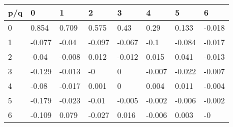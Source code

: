 \begin{tabular}{llllllll}
\toprule
p/q &      0 &      1 &      2 &      3 &      4 &      5 &      6 \\
\midrule
  0 &  0.854 &  0.709 &  0.575 &   0.43 &   0.29 &  0.133 & -0.018 \\
  1 & -0.077 &  -0.04 & -0.097 & -0.067 &   -0.1 & -0.084 & -0.017 \\
  2 &  -0.04 & -0.008 &  0.012 & -0.012 &  0.015 &  0.041 & -0.013 \\
  3 & -0.129 & -0.013 &     -0 &      0 & -0.007 & -0.022 & -0.007 \\
  4 &  -0.08 & -0.017 &  0.001 &      0 &  0.004 &  0.011 & -0.004 \\
  5 & -0.179 & -0.023 &  -0.01 & -0.005 & -0.002 & -0.006 & -0.002 \\
  6 & -0.109 &  0.079 & -0.027 &  0.016 & -0.006 &  0.003 &     -0 \\
\bottomrule
\end{tabular}
